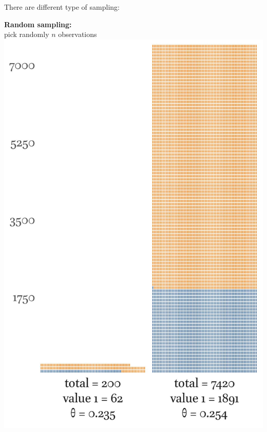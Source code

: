 \documentclass[13pt, t]{beamer}
\begin{document}
\begin{frame}{There are different type of sampling:}
\begin{multicols}{2}
\textbf{Random sampling:}\\
pick randomly $n$ observations
\columnbreak
\includegraphics[width=\linewidth]{images/03_simple_sample}
\end{multicols}
\end{frame}
\end{document}
